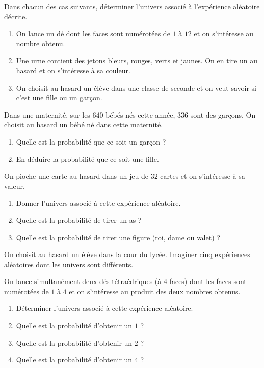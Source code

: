 \documentclass[11pt]{article}
\begin{document}
\begin{exo}
  Dans chacun des cas suivants, déterminer l'univers associé à l'expérience
  aléatoire décrite.
  \begin{enumerate}
    \item On lance un dé dont les faces sont numérotées de $1$ à $12$ et on
      s'intéresse au nombre obtenu.
    \item Une urne contient des jetons bleurs, rouges, verts et jaunes. On en
      tire un au hasard et on s'intéresse à sa couleur.
    \item On choisit au hasard un élève dans une classe de seconde et on veut
      savoir si c'est une fille ou un garçon.
  \end{enumerate}
\end{exo}

\begin{exo}
  Dans une maternité, sur les $640$ bébés nés cette année, $336$ sont des
  garçons. On choisit au hasard un bébé né dans cette maternité.
  \begin{enumerate}
    \item Quelle est la probabilité que ce soit un garçon ?
    \item En déduire la probabilité que ce soit une fille.
  \end{enumerate}
\end{exo}

\begin{exo}
  On pioche une carte au hasard dans un jeu de $32$ cartes et on s'intéresse à
  sa valeur.
  \begin{enumerate}
    \item Donner l'univers associé à cette expérience aléatoire.
    \item Quelle est la probabilité de tirer un as ?
    \item Quelle est la probabilité de tirer une figure (roi, dame ou valet) ?
  \end{enumerate}
\end{exo}

\begin{exo}
  On choisit au hasard un élève dans la cour du lycée. Imaginer cinq
  expériences aléatoires dont les univers sont différents.
\end{exo}

\begin{exo}
  On lance simultanément deux dés tétraédriques (à $4$ faces) dont les faces
  sont numérotées de $1$ à $4$ et on s'intéresse au produit des deux nombres
  obtenus.
  \begin{enumerate}
    \item Déterminer l'univers associé à cette expérience aléatoire.
    \item Quelle est la probabilité d'obtenir un $1$ ?
    \item Quelle est la probabilité d'obtenir un $2$ ?
    \item Quelle est la probabilité d'obtenir un $4$ ?
  \end{enumerate}
\end{exo}
\end{document}
